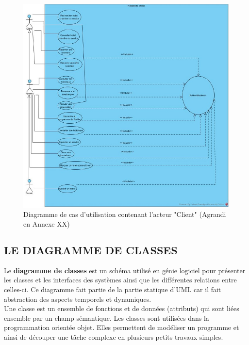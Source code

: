 \begin{figure}[!htbp]
	\begin{center}
		\includegraphics[scale=0.85]{images/diag_use_case1.jpg}
		\caption{Diagramme de cas d'utilisation contenant l'acteur "Client" (Agrandi en Annexe XX)}
		\label{use_case_diagramme_two}
	\end{center}
\end{figure}
\cleardoublepage
\subsection{LE DIAGRAMME DE CLASSES}

Le \textbf{diagramme de classes} est un schéma utilisé en génie logiciel pour présenter les classes et les interfaces des systèmes ainsi que les différentes relations entre celles-ci. Ce diagramme fait partie de la partie statique d'UML car il fait abstraction des aspects temporels et dynamiques.\\
Une classe est un ensemble de fonctions et de données (attributs) qui sont liées ensemble par un champ sémantique. Les classes sont utilisées dans la programmation orientée objet. Elles permettent de modéliser un programme et ainsi de découper une tâche complexe en plusieurs petits travaux simples.\\

